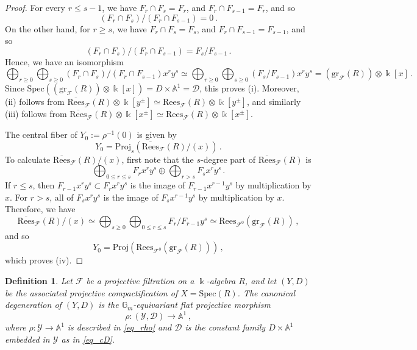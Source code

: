 \documentclass[12pt,letterpaper, reqno]{amsart}
\theoremstyle{defstyle} \newtheorem{definition}[theorem]{Definition}
\theoremstyle{remark}
\numberwithin{equation}{section}
\numberwithin{figure}{section}
\newcommand{\cF} {\mathcal{F}}
\newcommand{\Spec} {\mathrm{Spec}}
\newcommand{\Proj} {\mathrm{Proj}}
\newcommand{\gr} {\mathrm{gr}}
\newcommand{\kk} {\Bbbk}
\newcommand{\A} {\mathbb{A}}
\newcommand{\G} {\mathbb{G}}
\newcommand{\cY} {\mathcal{Y}}
\newcommand{\cD} {\mathcal{D}}
\begin{document}
\begin{proof} 
For every $r \leq s-1$, we have $F_r \cap F_s=F_r$, and $F_r \cap F_{s-1} =F_r$, and so 
\[ (F_r \cap F_s)/(F_r \cap F_{s-1})=0
\,.\] 
On the other hand, for $r \geq s$, we have $F_r \cap F_s=F_s$, and $F_r \cap F_{s-1}=F_{s-1}$, and so \[ (F_r \cap F_s)/(F_r \cap F_{s-1})=F_s/F_{s-1}\,.\] 
Hence, we have an isomorphism
\[ \bigoplus_{r \geq 0} \bigoplus_{s \geq 0} (F_r \cap F_s)/(F_r \cap F_{s-1}) x^r y^s\simeq 
\bigoplus_{r \geq 0} \bigoplus_{s \geq 0} 
(F_s/F_{s-1})x^r y^s = (\gr_\cF(R)) \otimes \kk[x] \,.\]
Since $\Spec ( (\gr_\cF(R)) \otimes \kk[x]) = D \times \A^1=\cD$, this proves (i).
Moreover, (ii) follows from $\overline{\mathrm{Rees}}_\cF(R) \otimes \kk[y^\pm] \simeq \mathrm{Rees}_\cF(R) \otimes \kk[y^\pm]$, and similarly (iii) follows from  $\overline{\mathrm{Rees}}_\cF(R) \otimes \kk[x^\pm] \simeq \mathrm{Rees}_\cF(R) \otimes \kk[x^\pm]$.

The central fiber of $Y_0:=\rho^{-1}(0)$ is given by 
\[ Y_0=\Proj_s (\overline{\mathrm{Rees}}_\cF(R)/(x))\,.\]
To calculate $\overline{\mathrm{Rees}}_\cF(R)/(x)$, first note that the $s$-degree part of $\overline{\mathrm{Rees}}_\cF(R)$ is
\[ \bigoplus_{0\leq r \leq s} F_r x^r y^s \oplus \bigoplus_{r>s} F_s x^r y^s \,.\]
If $r \leq s$, then $F_{r-1} x^r y^s \subset F_r x^r y^s$ is the image of $F_{r-1} x^{r-1}y^s$ by multiplication by $x$. For $r>s$, all of $F_s x^r y^s$ is the image of 
$F_s x^{r-1}y^s$ by multiplication by $x$. 
Therefore, 
we have 
\[ \overline{\mathrm{Rees}}_\cF(R)/(x) \simeq  \bigoplus_{s \geq 0} \bigoplus_{0 \leq r \leq s} F_r/F_{r-1} y^s \simeq \mathrm{Rees}_{\cF^0}(\gr_\cF(R)) \,,\]
and so 
\[ Y_0 =\Proj \left( \mathrm{Rees}_{\cF^0}(\gr_\cF(R))\right) \,,\]
which proves (iv).
\end{proof}


\begin{definition} \label{def_canonical_degeneration}
Let $\cF$ be a projective filtration on a $\kk$-algebra $R$, and let $(Y,D)$ be the associated projective compactification of $X=\Spec(R)$.
The \emph{canonical degeneration} of $(Y,D)$ is the 
$\G_m$-equivariant flat projective morphism
\[\rho: (\cY, \cD) \longrightarrow \A^1\,,\]
where $\rho: \cY \rightarrow \A^1$ is described in \eqref{eq_rho}
and $\cD$ is the constant family $D \times \A^1$ embedded in $\cY$ as in \eqref{eq_cD}.
\end{definition}
\end{document}
